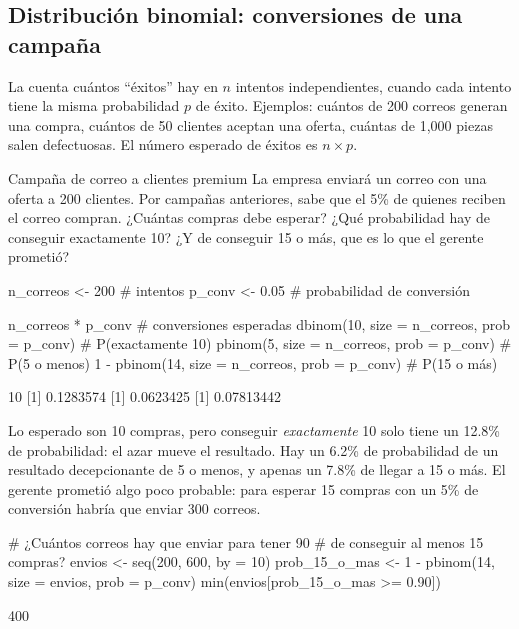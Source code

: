 \subsection{Distribución binomial: conversiones de una campaña}

La  cuenta cuántos ``éxitos'' hay en $n$
intentos independientes, cuando cada intento tiene la misma probabilidad
$p$ de éxito. Ejemplos: cuántos de 200 correos generan una compra, cuántos
de 50 clientes aceptan una oferta, cuántas de 1,000 piezas salen
defectuosas. El número esperado de éxitos es $n \times p$.

\begin{ejemplo}{Campaña de correo a clientes premium}
La empresa enviará un correo con una oferta a 200 clientes. Por campañas
anteriores, sabe que el 5\% de quienes reciben el correo compran. ¿Cuántas
compras debe esperar? ¿Qué probabilidad hay de conseguir exactamente 10?
¿Y de conseguir 15 o más, que es lo que el gerente prometió?
\end{ejemplo}

\begin{rcode}
n_correos  <- 200     # intentos
p_conv     <- 0.05    # probabilidad de conversión

n_correos * p_conv                            # conversiones esperadas
dbinom(10, size = n_correos, prob = p_conv)   # P(exactamente 10)
pbinom(5, size = n_correos, prob = p_conv)    # P(5 o menos)
1 - pbinom(14, size = n_correos, prob = p_conv)   # P(15 o más)
\end{rcode}
\begin{rsalida}
[1] 10
[1] 0.1283574
[1] 0.0623425
[1] 0.07813442
\end{rsalida}

Lo esperado son 10 compras, pero conseguir \emph{exactamente} 10 solo tiene
un 12.8\% de probabilidad: el azar mueve el resultado. Hay un 6.2\% de
probabilidad de un resultado decepcionante de 5 o menos, y apenas un 7.8\%
de llegar a 15 o más. El gerente prometió algo poco probable: para esperar
15 compras con un 5\% de conversión habría que enviar 300 correos.

\begin{rcode}
# ¿Cuántos correos hay que enviar para tener 90%
# de conseguir al menos 15 compras?
envios <- seq(200, 600, by = 10)
prob_15_o_mas <- 1 - pbinom(14, size = envios, prob = p_conv)
min(envios[prob_15_o_mas >= 0.90])
\end{rcode}
\begin{rsalida}
[1] 400
\end{rsalida}

